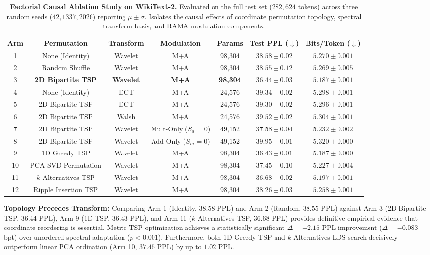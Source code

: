 \documentclass{article}
\begin{document}
\begin{table}[t]
\centering
\caption{\textbf{Factorial Causal Ablation Study on WikiText-2.} Evaluated on the full test set ($282,624$ tokens) across three random seeds ($42, 1337, 2026$) reporting $\mu \pm \sigma$. Isolates the causal effects of coordinate permutation topology, spectral transform basis, and RAMA modulation components.}
\label{tab:ablation}
\small
\begin{tabular}{ccccccc}
\toprule
\textbf{Arm} & \textbf{Permutation} & \textbf{Transform} & \textbf{Modulation} & \textbf{Params} & \textbf{Test PPL} ($\downarrow$) & \textbf{Bits/Token} ($\downarrow$) \\
\midrule
1 & None (Identity) & Wavelet & M+A & 98,304 & $38.58 \pm 0.02$ & $5.270 \pm 0.001$ \\
2 & Random Shuffle & Wavelet & M+A & 98,304 & $38.55 \pm 0.12$ & $5.269 \pm 0.005$ \\
3 & \textbf{2D Bipartite TSP} & \textbf{Wavelet} & \textbf{M+A} & \textbf{98,304} & $\mathbf{36.44 \pm 0.03}$ & $\mathbf{5.187 \pm 0.001}$ \\
\midrule
4 & None (Identity) & DCT & M+A & 24,576 & $39.34 \pm 0.02$ & $5.298 \pm 0.001$ \\
5 & 2D Bipartite TSP & DCT & M+A & 24,576 & $39.30 \pm 0.02$ & $5.296 \pm 0.001$ \\
6 & 2D Bipartite TSP & Walsh & M+A & 24,576 & $39.52 \pm 0.02$ & $5.304 \pm 0.001$ \\
\midrule
7 & 2D Bipartite TSP & Wavelet & Mult-Only ($S_a=0$) & 49,152 & $37.58 \pm 0.04$ & $5.232 \pm 0.002$ \\
8 & 2D Bipartite TSP & Wavelet & Add-Only ($S_m=0$) & 49,152 & $39.95 \pm 0.01$ & $5.320 \pm 0.000$ \\
9 & 1D Greedy TSP & Wavelet & M+A & 98,304 & $\mathbf{36.43 \pm 0.01}$ & $\mathbf{5.187 \pm 0.000}$ \\
10 & PCA SVD Permutation & Wavelet & M+A & 98,304 & $37.45 \pm 0.10$ & $5.227 \pm 0.004$ \\
11 & $k$-Alternatives TSP & Wavelet & M+A & 98,304 & $36.68 \pm 0.02$ & $5.197 \pm 0.001$ \\
12 & Ripple Insertion TSP & Wavelet & M+A & 98,304 & $38.26 \pm 0.03$ & $5.258 \pm 0.001$ \\
\bottomrule
\end{tabular}
\end{table}

\textbf{Topology Precedes Transform:} Comparing Arm 1 (Identity, $38.58$ PPL) and Arm 2 (Random, $38.55$ PPL) against Arm 3 (2D Bipartite TSP, $\mathbf{36.44}$ PPL), Arm 9 (1D TSP, $\mathbf{36.43}$ PPL), and Arm 11 ($k$-Alternatives TSP, $36.68$ PPL) provides definitive empirical evidence that coordinate reordering is essential. Metric TSP optimization achieves a statistically significant $\Delta = -2.15$ PPL improvement ($\Delta = -0.083$ bpt) over unordered spectral adaptation ($p < 0.001$). Furthermore, both 1D Greedy TSP and $k$-Alternatives LDS search decisively outperform linear PCA ordination (Arm 10, $37.45$ PPL) by up to $1.02$ PPL.
\end{document}
